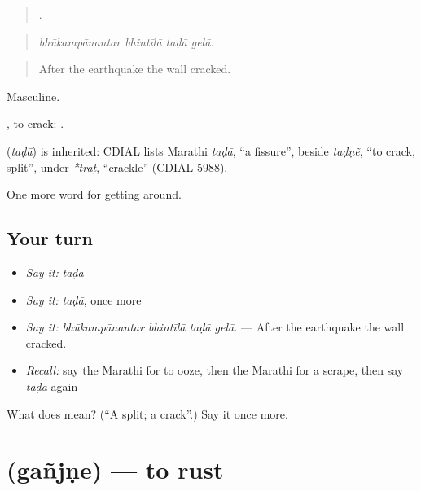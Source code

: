 \begin{quote}
   .
\end{quote}

\begin{quote}
\emph{bhūkampānantar bhintīlā taḍā gelā.}
\end{quote}

\begin{quote}
After the earthquake the wall cracked.
\end{quote}

Masculine.

 , to crack:   .

\begin{cousinweb}
\textbf{} (\emph{taḍā}) is inherited: CDIAL lists Marathi \emph{taḍā}, \textquotedblleft{}a fissure\textquotedblright{}, beside \emph{taḍṇẽ}, \textquotedblleft{}to crack, split\textquotedblright{}, under \emph{*traṭ}, \textquotedblleft{}crackle\textquotedblright{} (CDIAL 5988).
\end{cousinweb}

\begin{grammarlens}[title={What you've built}]
One more word for getting around.
\end{grammarlens}

\subsection*{Your turn}
\begin{itemize}
\raggedright
  \item \emph{Say it:} \emph{taḍā}
  \item \emph{Say it:} \emph{taḍā}, once more
  \item \emph{Say it:} \emph{bhūkampānantar bhintīlā taḍā gelā.} — After the earthquake the wall cracked.
  \item \emph{Recall:} say the Marathi for to ooze, then the Marathi for a scrape, then say \emph{taḍā} again
\end{itemize}

\begin{tcolorbox}[breakable,colback=teal!4,colframe=teal!35!black,title={Before you move on}]
What does  mean? (\textquotedblleft{}A split; a crack\textquotedblright{}.) Say it once more.
\end{tcolorbox}
\section[\texorpdfstring{\mr{गंजणे} (gañjṇe)}{गंजणे (gañjṇe)}]{ (gañjṇe) — to rust}

